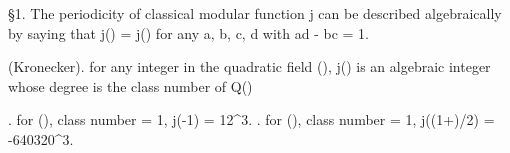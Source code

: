
  \S 1. The periodicity of classical modular function j can be 
described algebraically by saying that j(\tau) = j() 
for any a, b, c, d \in \Z with ad - bc = 1.

\theorem (Kronecker). for any integer \tau in the quadratic field \Q(), 
j(\tau) is an algebraic integer whose degree is the class number of Q()

\example. for \Q(), class number = 1, j(-1) = 12^3.
\example. for \Q(), class number = 1, j((1+)/2) = -640320^3.

